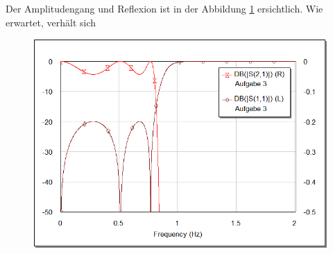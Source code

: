 Der Amplitudengang und Reflexion ist in der Abbildung \ref{fig:graph-richards} ersichtlich. Wie erwartet, verh\"alt sich 

\begin{figure}[h!]
    \centering
    \includegraphics[width=\imagewidth]{images/graph-richards}
    \caption{}
    \label{fig:graph-richards}
\end{figure}


